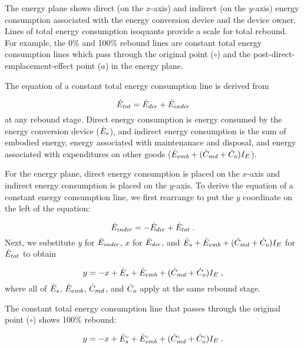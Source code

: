 The energy plane shows direct (on the $x$-axis) and indirect (on the $y$-axis)
energy consumption associated with the energy conversion device 
and the device owner.
Lines of total energy consumption isoquants provide a 
scale for total rebound.
For example, the 0\% and 100\% rebound lines are constant total energy consumption
lines which pass through the original point ($\circ$) and
the post-direct-emplacement-effect point ($a$) 
in the energy plane.

The equation of a constant total energy consumption line is derived from 

\begin{equation}
  \dot{E}_{tot} = \dot{E}_{dir} + \dot{E}_{indir}
\end{equation}
%
at any rebound stage.
Direct energy consumption is energy consumed by the energy conversion device
($\dot{E}_s$), and 
indirect energy consumption is the sum of embodied energy, 
energy associated with maintenanace and disposal, and energy associated 
with expenditures on other goods
($\dot{E}_{emb} + (\dot{C}_{md} + \dot{C}_o) I_E$).

For the energy plane, 
direct energy consumption is placed on the $x$-axis and 
indirect energy consumption is placed on the $y$-axis.
To derive the equation of a constant energy consumption line, 
we first rearrange to put the $y$ coordinate on the left of the equation:

\begin{equation}
  \dot{E}_{indir} = - \dot{E}_{dir} + \dot{E}_{tot} \; .
\end{equation}
%
Next, we substitute $y$ for $\dot{E}_{indir}$,
$x$ for $\dot{E}_{dir}$, and 
$\dot{E}_s + \dot{E}_{emb} + (\dot{C}_{md} + \dot{C}_o) I_E$ for $\dot{E}_{tot}$
to obtain

\begin{equation}
  y = -x + \dot{E}_s + \dot{E}_{emb} + (\dot{C}_{md} + \dot{C}_o) I_E \; ,
\end{equation}
%
where all of $\dot{E}_s$, $\dot{E}_{emb}$, $\dot{C}_{md}$, and $\dot{C}_o$
apply at the same rebound stage.

The constant total energy consumption line 
that passes through the original point ($\circ$)
shows 100\% rebound:

\begin{equation}
  y = -x + {}{\dot{E}}^{\scriptscriptstyle \circ}_s + {}{\dot{E}}^{\scriptscriptstyle \circ}_{emb} + ({}{\dot{C}}^{\scriptscriptstyle \circ}_{md} + {}{\dot{C}}^{\scriptscriptstyle \circ}_o) I_E \; .
\end{equation}

